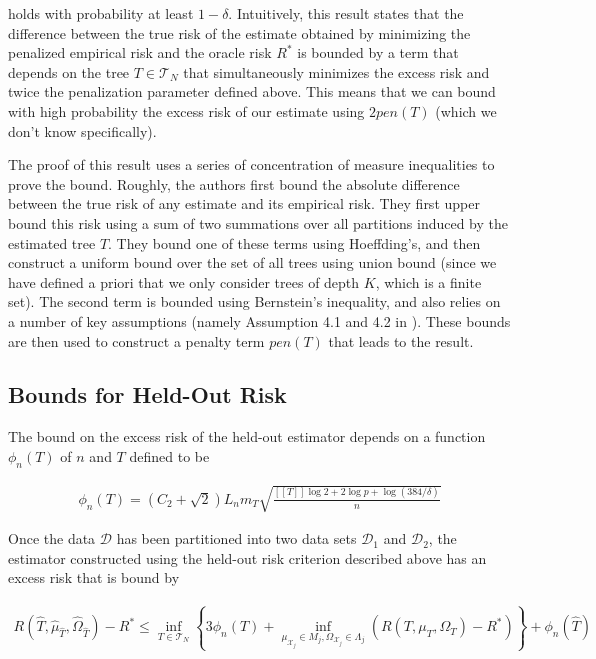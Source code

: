 \documentclass[12pt]{article}
\begin{document}
holds with probability at least $1 - \delta$. Intuitively, this result states that the difference between the true risk of the estimate obtained by minimizing the penalized empirical risk and the oracle risk $R^*$ is bounded by a term that depends on the tree $T \in \mathcal{T}_N$ that simultaneously minimizes the excess risk and twice the penalization parameter defined above. This means that we can bound with high probability the excess risk of our estimate using $2 pen(T)$ (which we don't know specifically).

The proof of this result uses a series of concentration of measure inequalities to prove the bound. Roughly, the authors first bound the absolute difference between the true risk of any estimate and its empirical risk. They first upper bound this risk using a sum of two summations over all partitions induced by the estimated tree $T$. They bound one of these terms using Hoeffding's, and then construct a uniform bound over the set of all trees using union bound (since we have defined a priori that we only consider trees of depth $K$, which is a finite set). The second term is bounded using Bernstein's inequality, and also relies on a number of key assumptions (namely Assumption 4.1 and 4.2 in \cite{liu2009}). These bounds are then used to construct a penalty term $pen(T)$ that leads to the result.

\subsection{Bounds for Held-Out Risk}

The bound on the excess risk of the held-out estimator depends on a function $\phi_n(T)$ of $n$ and $T$ defined to be

\begin{align}
    \phi_n(T) = (C_2 + \sqrt{2}) L_n m_T
    \sqrt{
        \frac{[[T]] \log 2 + 2 \log p + \log(384/\delta)}{n}
    }
\end{align}

Once the data $\mathcal{D}$ has been partitioned into two data sets $\mathcal{D}_1$ and $\mathcal{D}_2$, the estimator constructed using the held-out risk criterion described above has an excess risk that is bound by

\begin{align}
    R(\hat{T}, \hat{\mu}_{\hat{T}}, \hat{\Omega}_{\hat{T}}) - R^*
    \le \underset{T \in \mathcal{T}_N}{\inf}
    \left\{
        3 \phi_n(T) +
        \underset{\mu_{\mathcal{X}_j} \in M_j, \Omega_{\mathcal{X}_j} \in \Lambda_j}{\inf}
        (R(T, \mu_T, \Omega_T) - R^*)
    \right\} + \phi_n (\hat{T})
\end{align}
\end{document}
